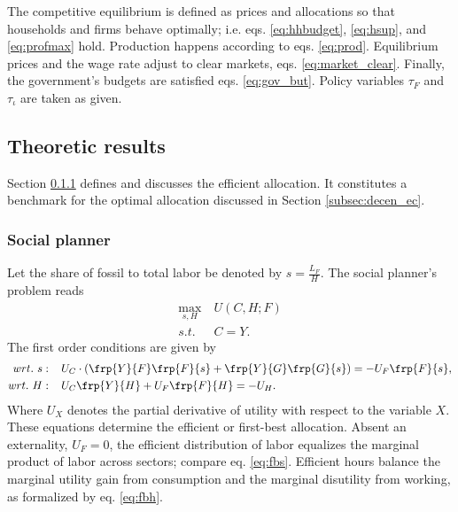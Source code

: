The competitive equilibrium is defined as prices and allocations so that households and firms behave optimally; i.e. eqs. \eqref{eq:hhbudget}, \eqref{eq:hsup}, and \eqref{eq:profmax} hold. Production happens according to eqs. \eqref{eq:prod}.  Equilibrium prices and the wage rate adjust to clear markets, eqs. \eqref{eq:market_clear}. Finally, the government's budgets are satisfied eqs. \eqref{eq:gov_but}. Policy variables $\tau_F$ and $\tau_\iota$ are taken as given. 

\subsection{Theoretic results}\label{sec:theory}
Section \ref{subsec:sp} defines and discusses the efficient allocation. It constitutes a benchmark for the optimal allocation discussed in Section \ref{subsec:decen_ec}. 

\subsubsection{Social planner}\label{subsec:sp}
Let the share of fossil to total labor be denoted by $s=\frac{L_F}{H}$. The social planner's problem reads
\begin{align*}
\underset{s, H}{\max}\ & U(C,H; F)\\ s.t.\ \ & C=Y.
\end{align*}
The first order conditions are given by
\begin{align}
wrt.\ s:\hspace{4mm} & U_C \cdot \left(\frp{Y}{F}\frp{F}{s}+\frp{Y}{G}\frp{G}{s}\right)=-U_F\frp{F}{s}, \label{eq:fbs}
\\
wrt.\ H:\hspace{4mm} & U_C\frp{Y}{H}+U_F\frp{F}{H}=-U_H\label{eq:fbh}. 
\end{align}
Where $U_X$ denotes the partial derivative of utility with respect to the variable $X$.
These equations determine the efficient or first-best allocation. 
Absent an externality, $U_F=0$, the efficient distribution of labor equalizes the marginal product of labor across sectors; compare eq. \eqref{eq:fbs}. Efficient hours balance the marginal utility gain from consumption and the marginal disutility from working, as formalized by eq. \eqref{eq:fbh}. 

